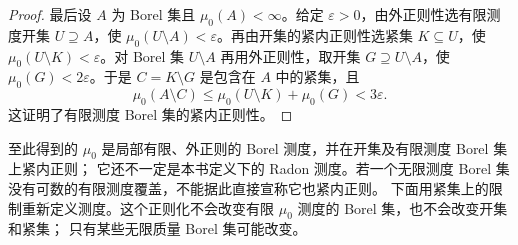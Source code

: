 \begin{proof}
最后设 \(A\) 为 Borel 集且 \(\mu_0(A)<\infty\)。给定 \(\varepsilon>0\)，由外正则性选有限测度开集 \(U\supseteq A\)，使 \(\mu_0(U\setminus A)<\varepsilon\)。再由开集的紧内正则性选紧集 \(K\subseteq U\)，使 \(\mu_0(U\setminus K)<\varepsilon\)。对 Borel 集 \(U\setminus A\) 再用外正则性，取开集 \(G\supseteq U\setminus A\)，使 \(\mu_0(G)<2\varepsilon\)。于是 \(C=K\setminus G\) 是包含在 \(A\) 中的紧集，且
\[
 \mu_0(A\setminus C)
 \leq\mu_0(U\setminus K)+\mu_0(G)<3\varepsilon.
\]
这证明了有限测度 Borel 集的紧内正则性。
\end{proof}

至此得到的 \(\mu_0\) 是局部有限、外正则的 Borel 测度，并在开集及有限测度 Borel 集上紧内正则；
它还不一定是本书定义下的 Radon 测度。若一个无限测度 Borel 集没有可数的有限测度覆盖，不能据此直接宣称它也紧内正则。
下面用紧集上的限制重新定义测度。这个正则化不会改变有限 \(\mu_0\) 测度的 Borel 集，也不会改变开集和紧集；
只有某些无限质量 Borel 集可能改变。

